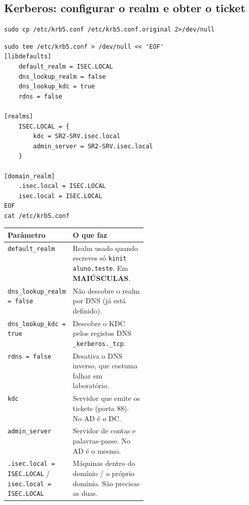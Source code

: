 
\subsection[Kerberos: configurar o realm e obter o ticket]{Kerberos: configurar o realm e obter o ticket}



\begin{lstlisting}[style=bashstyle]
sudo cp /etc/krb5.conf /etc/krb5.conf.original 2>/dev/null
\end{lstlisting}


\begin{lstlisting}[style=bashstyle]
sudo tee /etc/krb5.conf > /dev/null << 'EOF'
[libdefaults]
    default_realm = ISEC.LOCAL
    dns_lookup_realm = false
    dns_lookup_kdc = true
    rdns = false

[realms]
    ISEC.LOCAL = {
        kdc = SR2-SRV.isec.local
        admin_server = SR2-SRV.isec.local
    }

[domain_realm]
    .isec.local = ISEC.LOCAL
    isec.local = ISEC.LOCAL
EOF
cat /etc/krb5.conf
\end{lstlisting}

\begin{center}\small
\begin{tabularx}{\linewidth}{|>{\raggedright\arraybackslash}p{0.32\linewidth}|>{\raggedright\arraybackslash}X|}
\hline
\rowcolor{azul!10}\textbf{Parâmetro} & \textbf{O que faz} \\
\hline
\texttt{default\_realm} & Realm usado quando escreves só \texttt{kinit aluno.teste}. Em \textbf{MAIÚSCULAS}. \\
\hline
\texttt{dns\_lookup\_realm = false} & Não descobre o realm por DNS (já está definido). \\
\hline
\texttt{dns\_lookup\_kdc = true} & Descobre o KDC pelos registos DNS \texttt{\_kerberos.\_tcp}. \\
\hline
\texttt{rdns = false} & Desativa o DNS inverso, que costuma falhar em laboratório. \\
\hline
\texttt{kdc} & Servidor que emite os tickets (porta 88). No AD é o DC. \\
\hline
\texttt{admin\_server} & Servidor de contas e palavras-passe. No AD é o mesmo. \\
\hline
\texttt{.isec.local = ISEC.LOCAL} / \texttt{isec.local = ISEC.LOCAL} & Máquinas dentro do domínio / o próprio domínio. São precisas as duas. \\
\hline
\end{tabularx}
\end{center}

